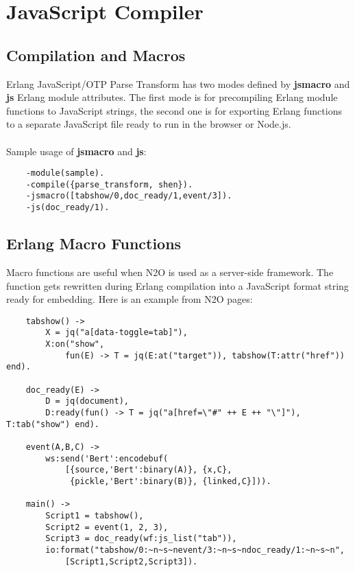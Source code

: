 \section{JavaScript Compiler}

\subsection{Compilation and Macros}
Erlang JavaScript/OTP Parse Transform has two modes defined
by {\bf \-jsmacro} and {\bf \-js} Erlang module attributes.
The first mode is for precompiling Erlang module functions
to JavaScript strings, the second one is for exporting Erlang functions
to a separate JavaScript file ready to run in the browser or Node.js.

\paragraph{}
Sample usage of {\bf \-jsmacro} and {\bf \-js}:

\vspace{1\baselineskip}
\begin{lstlisting}
    -module(sample).
    -compile({parse_transform, shen}).
    -jsmacro([tabshow/0,doc_ready/1,event/3]).
    -js(doc_ready/1).
\end{lstlisting}

\subsection{Erlang Macro Functions}
Macro functions are useful when N2O is used as a server-side framework.
The function gets rewritten during Erlang compilation into a JavaScript format
string ready for embedding. Here is an example from N2O pages:

\begin{lstlisting}
    tabshow() ->
        X = jq("a[data-toggle=tab]"),
        X:on("show", 
            fun(E) -> T = jq(E:at("target")), tabshow(T:attr("href")) end).

    doc_ready(E) ->
        D = jq(document),
        D:ready(fun() -> T = jq("a[href=\"#" ++ E ++ "\"]"), T:tab("show") end).

    event(A,B,C) ->
        ws:send('Bert':encodebuf(
            [{source,'Bert':binary(A)}, {x,C},
             {pickle,'Bert':binary(B)}, {linked,C}])).

    main() ->
        Script1 = tabshow(),
        Script2 = event(1, 2, 3),
        Script3 = doc_ready(wf:js_list("tab")),
        io:format("tabshow/0:~n~s~nevent/3:~n~s~ndoc_ready/1:~n~s~n",
            [Script1,Script2,Script3]).
\end{lstlisting}
\vspace{1\baselineskip}

